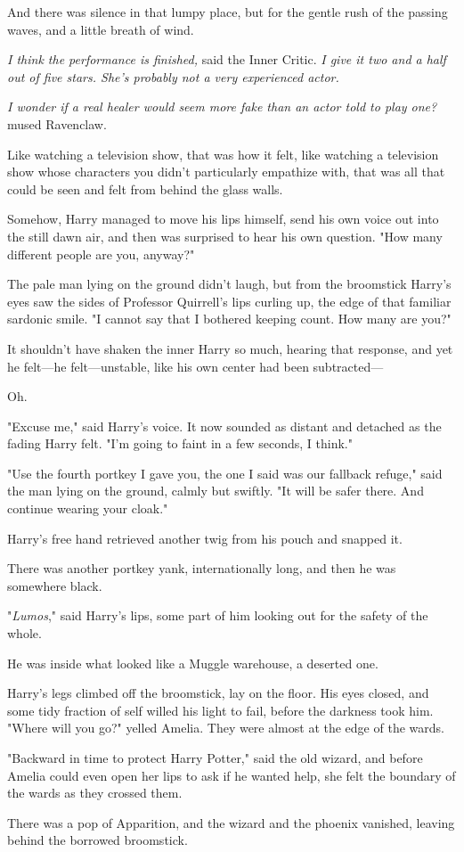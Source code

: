 And there was silence in that lumpy place, but for the gentle rush of the 
passing waves, and a little breath of wind.

\emph{I think the performance is finished,} said the Inner Critic. \emph{I give 
it two and a half out of five stars. She's probably not a very experienced 
actor.}

\emph{I wonder if a real healer would seem more fake than an actor told to play 
one?} mused Ravenclaw.

Like watching a television show, that was how it felt, like watching a 
television show whose characters you didn't particularly empathize with, that 
was all that could be seen and felt from behind the glass walls.

Somehow, Harry managed to move his lips himself, send his own voice out into 
the still dawn air, and then was surprised to hear his own question. "How many 
different people are you, anyway?"

The pale man lying on the ground didn't laugh, but from the broomstick Harry's 
eyes saw the sides of Professor Quirrell's lips curling up, the edge of that 
familiar sardonic smile. "I cannot say that I bothered keeping count. How many 
are you?"

It shouldn't have shaken the inner Harry so much, hearing that response, and 
yet he felt---he felt---unstable, like his own center had been subtracted---

Oh.

"Excuse me," said Harry's voice. It now sounded as distant and detached as the 
fading Harry felt. "I'm going to faint in a few seconds, I think."

"Use the fourth portkey I gave you, the one I said was our fallback refuge," 
said the man lying on the ground, calmly but swiftly. "It will be safer there. 
And continue wearing your cloak."

Harry's free hand retrieved another twig from his pouch and snapped it.

There was another portkey yank, internationally long, and then he was somewhere 
black.

"\emph{Lumos}," said Harry's lips, some part of him looking out for the safety 
of the whole.

He was inside what looked like a Muggle warehouse, a deserted one.

Harry's legs climbed off the broomstick, lay on the floor. His eyes closed, and 
some tidy fraction of self willed his light to fail, before the darkness took 
him.
\sbreak
"Where will you go?" yelled Amelia. They were almost at the edge of the wards.

"Backward in time to protect Harry Potter," said the old wizard, and before 
Amelia could even open her lips to ask if he wanted help, she felt the boundary 
of the wards as they crossed them.

There was a pop of Apparition, and the wizard and the phoenix vanished, leaving 
behind the borrowed broomstick.